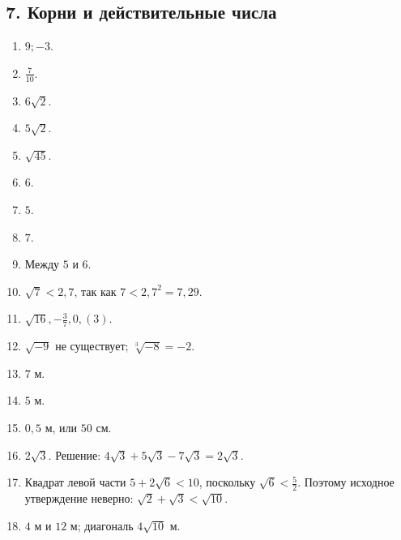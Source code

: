 \documentclass[12pt,a4paper]{article}
\theoremstyle{definition}
\theoremstyle{plain}
\theoremstyle{remark}
\newcommand{\starmark}{\ensuremath{{}^{\ast}}}
\begin{document}
\subsection*{7. Корни и действительные числа}
\begin{enumerate}[label=7.\arabic*.,leftmargin=2.8em,itemsep=5pt]
\item \(9;\allowbreak - 3\).
\item \(\frac{7}{10}\).
\item \(6 \sqrt{2}\).
\item \(5 \sqrt{2}\).
\item \(\sqrt{45}\).
\item \(6\).
\item \(5\).
\item \(7\).
\item Между \(5\) и \(6\).
\item \(\sqrt{7} < 2{,}7\), так как \(7 < 2{,}7^{2} = 7{,}29\).
\item \(\sqrt{16},\allowbreak - \frac{3}{7},\allowbreak 0{,}(3)\).
\item \(\sqrt{- 9}\) не существует; \(\sqrt[3]{- 8} = - 2\).
\item \(7\) м.
\item \(5\) м.
\item \(0{,}5\) м, или \(50\) см.
\item[\textbf{7.16.}\starmark] \(2\sqrt{3}\). Решение: \(4\sqrt{3} + 5\sqrt{3} - 7\sqrt{3} = 2\sqrt{3}\).
\item[\textbf{7.17.}\starmark] Квадрат левой части \(5 + 2 \sqrt{6} < 10\), поскольку \(\sqrt{6} < \frac{5}{2}\). Поэтому исходное утверждение неверно: \(\sqrt{2} + \sqrt{3} < \sqrt{10}\).
\item[\textbf{7.18.}\starmark] \(4\) м и \(12\) м; диагональ \(4 \sqrt{10}\) м.
\end{enumerate}
\end{document}
